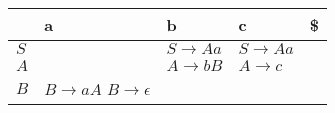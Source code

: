 \documentclass{standalone}
\providecommand\lightrule{%
	\arrayrulecolor{black!30}%
	\midrule[\lightrulewidth]%
	\arrayrulecolor{black}}
\begin{document}
\begin{tabularx}{\textwidth}{XXXXX}
     & a & b & c & \$ \\
    \midrule
        \(S\)
        &
        
        &
        \(S \rightarrow Aa\)
        &
        \(S \rightarrow Aa\)
        &
        \\ \lightrule
        \(A\)
        &
        
        &
        \(A \rightarrow bB\)
        &
        \(A \rightarrow c\)
        &
        \\ \lightrule
        \(B\)
        &
        \(B \rightarrow aA\)
        \newline
        \(B \rightarrow \epsilon\)
        &
        
        &
        
        &
\end{tabularx}
\end{document}
